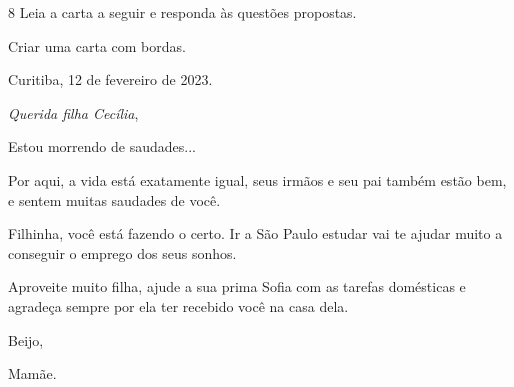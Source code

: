 


\num{8} Leia a carta a seguir e responda às questões propostas.

Criar uma carta com bordas.

\begin{mdframed}[linewidth=10pt,linecolor=salmao!20,backgroundcolor=salmao!20,roundcorner=20pt]
Curitiba, 12 de fevereiro de 2023.

\emph{Querida filha Cecília},

Estou morrendo de saudades...

Por aqui, a vida está exatamente igual, seus irmãos e seu pai também
estão bem, e sentem muitas saudades de você.

Filhinha, você está fazendo o certo. Ir a São Paulo estudar vai te
ajudar muito a conseguir o emprego dos seus sonhos.

Aproveite muito filha, ajude a sua prima Sofia com as tarefas domésticas
e agradeça sempre por ela ter recebido você na casa dela.

\begin{flushright}
Beijo,

Mamãe.
\end{flushright}
\end{mdframed}

